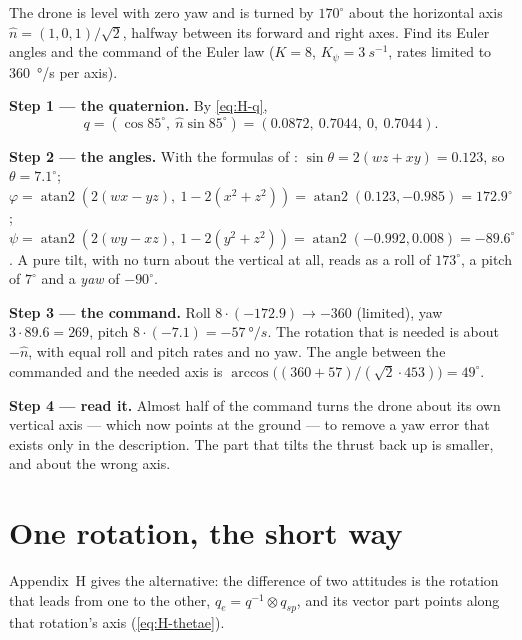 \begin{example}
\label{ex:geometric-euler}
The drone is level with zero yaw and is turned by $170^\circ$ about the horizontal axis $\hat n = (1, 0, 1)/\sqrt2$, halfway between its forward and right axes. Find its Euler angles and the command of the Euler law ($K = 8$, $K_\psi = \SI{3}{s^{-1}}$, rates limited to \SI{360}{\degree/s} per axis).

\textbf{Step 1 — the quaternion.} By \cref{eq:H-q},
\begin{equation*}
  q = (\cos85^\circ,\ \hat n\sin85^\circ) = (0.0872,\ 0.7044,\ 0,\ 0.7044) .
\end{equation*}

\textbf{Step 2 — the angles.} With the formulas of : $\sin\theta = 2(wz + xy) = 0.123$, so $\theta = 7.1^\circ$; $\varphi = \operatorname{atan2}(2(wx - yz),\ 1 - 2(x^2 + z^2)) = \operatorname{atan2}(0.123, -0.985) = 172.9^\circ$; $\psi = \operatorname{atan2}(2(wy - xz),\ 1 - 2(y^2 + z^2)) = \operatorname{atan2}(-0.992, 0.008) = -89.6^\circ$. A pure tilt, with no turn about the vertical at all, reads as a roll of $173^\circ$, a pitch of $7^\circ$ and a \emph{yaw} of $-90^\circ$.

\textbf{Step 3 — the command.} Roll $8 \cdot (-172.9) \to -360$ (limited), yaw $3 \cdot 89.6 = 269$, pitch $8 \cdot (-7.1) = \SI{-57}{\degree/s}$. The rotation that is needed is about $-\hat n$, with equal roll and pitch rates and no yaw. The angle between the commanded and the needed axis is $\arccos\big((360 + 57)/(\sqrt2 \cdot 453)\big) = 49^\circ$.

\textbf{Step 4 — read it.} Almost half of the command turns the drone about its own vertical axis — which now points at the ground — to remove a yaw error that exists only in the description. The part that tilts the thrust back up is smaller, and about the wrong axis.
\end{example}

\section{One rotation, the short way}

Appendix~H gives the alternative: the difference of two attitudes is the rotation that leads from one to the other, $q_e = q^{-1} \otimes q_{sp}$, and its vector part points along that rotation's axis (\cref{eq:H-thetae}).


